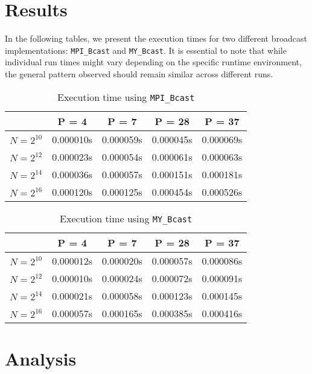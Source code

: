 \documentclass[12pt,a4paper]{article}
\begin{document}
  
  
  
  
\section{Results}

In the following tables, 
we present the execution times for two different broadcast implementations: 
\texttt{MPI\_Bcast} and \texttt{MY\_Bcast}. 
It is essential to note that while individual run times might vary depending on the specific runtime environment, 
the general pattern observed should remain similar across different runs.

\begin{table}[!htb]
    \centering
    \begin{tabular}{|c|c|c|c|c|}
    \hline
    & P = 4 & P = 7 & P = 28 & P = 37 \\
    \hline
    $N = 2^{10}$ & 0.000010s & 0.000059s & 0.000045s & 0.000069s \\
    \hline
    $N = 2^{12}$ & 0.000023s & 0.000054s & 0.000061s & 0.000063s \\
    \hline
    $N = 2^{14}$ & 0.000036s & 0.000057s & 0.000151s & 0.000181s \\
    \hline
    $N = 2^{16}$ & 0.000120s & 0.000125s & 0.000454s & 0.000526s \\
    \hline
    \end{tabular}
    \caption{Execution time using \texttt{MPI\_Bcast}}
    \end{table}

\begin{table}[!htb]
    \centering
    \begin{tabular}{|c|c|c|c|c|}
    \hline
    & P = 4 & P = 7 & P = 28 & P = 37 \\
    \hline
    $N = 2^{10}$ & 0.000012s & 0.000020s & 0.000057s & 0.000086s \\
    \hline
    $N = 2^{12}$ & 0.000010s & 0.000024s & 0.000072s & 0.000091s \\
    \hline
    $N = 2^{14}$ & 0.000021s & 0.000058s & 0.000123s & 0.000145s \\
    \hline
    $N = 2^{16}$ & 0.000057s & 0.000165s & 0.000385s & 0.000416s \\
    \hline
    \end{tabular}
    \caption{Execution time using \texttt{MY\_Bcast}}
    \end{table}

\section{Analysis}
\end{document}
